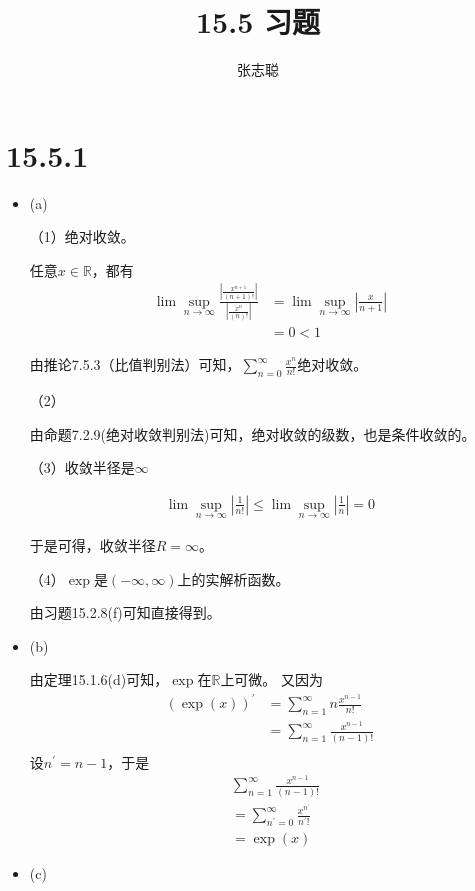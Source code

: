 \documentclass{article}
\begin{document}
\title{15.5 习题}
\author{张志聪}
\maketitle

\section*{15.5.1}

\begin{itemize}
  \item (a)

        （1）绝对收敛。

        任意$x \in \mathbb{R}$，都有
        \begin{align*}
          \lim\sup\limits_{n \to \infty} \frac{|\frac{x^{n + 1}}{(n + 1)!}|}{|\frac{x^{n}}{(n)!}|}
           & = \lim\sup\limits_{n \to \infty} |\frac{x}{n + 1}| \\
           & = 0 < 1
        \end{align*}

        由推论7.5.3（比值判别法）可知，$\sum\limits_{n = 0}^\infty \frac{x^n}{n!}$绝对收敛。

        （2）

        由命题7.2.9(绝对收敛判别法)可知，绝对收敛的级数，也是条件收敛的。

        （3）收敛半径是$\infty$

        \begin{align*}
          \lim\sup\limits_{n \to \infty} |\frac{1}{n!}| \leq \lim\sup\limits_{n \to \infty} |\frac{1}{n}| = 0
        \end{align*}

        于是可得，收敛半径$R = \infty$。

        （4）$\exp$是$(-\infty, \infty)$上的实解析函数。

        由习题15.2.8(f)可知直接得到。

  \item (b)

        由定理15.1.6(d)可知，$\exp$在$\mathbb{R}$上可微。
        又因为
        \begin{align*}
          (\exp(x))^\prime & = \sum\limits_{n = 1}^\infty n \frac{x^{n - 1}}{n!}   \\
                           & = \sum\limits_{n = 1}^\infty \frac{x^{n - 1}}{(n-1)!} \\
        \end{align*}
        设$n^\prime = n - 1$，于是
        \begin{align*}
           & \sum\limits_{n = 1}^\infty \frac{x^{n - 1}}{(n-1)!}                \\
           & = \sum\limits_{n^\prime = 0}^\infty \frac{x^{n^\prime}}{n^\prime!} \\
           & = \exp(x)
        \end{align*}
  \item (c)


\end{itemize}
\end{document}
